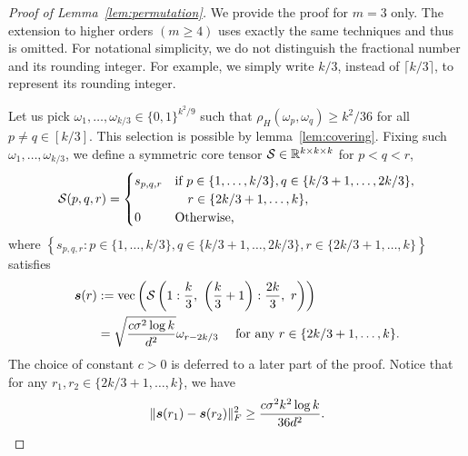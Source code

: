 \documentclass[12pt]{article}
\theoremstyle{definition}
\begin{document}
\begin{proof}[Proof of Lemma~\ref{lem:permutation}]
We provide the proof for $m=3$ only. The extension to higher orders $(m\geq 4)$ uses exactly the same techniques and thus is omitted. For notational simplicity, we do not distinguish the fractional number and its rounding integer. For example, we simply write $k/3$, instead of $\lceil k/3\rceil$, to represent its rounding integer. 

Let us pick $\omega_1,\ldots,\omega_{k/3}\in\{0,1\}^{k^2/9}$ such that $\rho_H(\omega_p,\omega_q)\geq k^2/36$ for all $p\neq q\in [k/3]$. This selection is possible by lemma~\ref{lem:covering}.
Fixing such $\omega_1,\ldots,\omega_{k/3}$, we define a symmetric core tensor $\mathcal{S}\in\mathbb{R}^{k\times k\times k}$ for $p<q<r$,
\begin{align}\label{eq:S}
    \mathcal{S}(p,q,r) = \begin{cases}s_{p,q,r} &\text{if }p\in\{1,\ldots,k/3\},q\in\{k/3+1,\ldots,2k/3\},\\
    & \quad r\in\{2k/3+1,\ldots,k\},\\
    0 &\text{Otherwise,}
    \end{cases}
\end{align}
where $\left\{s_{p,q,r}\colon p\in\{1,\ldots,k/3\},q\in\{k/3+1,\ldots,2k/3\}, r\in\{2k/3+1,\ldots,k \}\right\}$ satisfies
\begin{align}
\label{eq:structure}
    \ms(r)&:= \text{vec}\left(\tS\left(1:\frac{k}{3},\ \left(\frac{k}{3}+1\right):\frac{2k}{3},\ r\right)\right)\notag \\
    &= \sqrt{c\sigma^2\log k\over d^{2}}\omega_{r-2k/3} \quad \text{ for any } r\in\{2k/3+1,\ldots,k\}.
\end{align}
The choice of constant $c>0$ is deferred to a later part of the proof.
Notice that for any $r_1,r_2\in\{2k/3+1,\ldots,k\}$, we have
\begin{align}\label{eq:sr}
    \lVert\bm{s}(r_1)-\bm{s}(r_2)\rVert_F^2\geq \frac{c\sigma^2k^2\log k}{36d^2}.
\end{align}


\end{proof}
\end{document}
